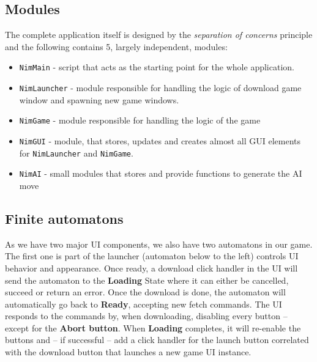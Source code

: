 \documentclass[10pt]{scrartcl}
\begin{document}
\subsection{Modules}
The complete application itself is designed by the \emph{separation of concerns} principle and the following contains 5, largely independent, modules:
\begin{itemize}
  \item \texttt{NimMain} - script that acts as the starting point for the whole application.
  \item \texttt{NimLauncher} - module responsible for handling the logic of download game window and spawning new game windows.
  \item \texttt{NimGame} - module responsible for handling the logic of the game
  \item \texttt{NimGUI} - module, that stores, updates and creates almost all GUI elements for \texttt{NimLauncher} and \texttt{NimGame}.
  \item \texttt{NimAI} - small modules that stores and provide functions to generate the AI move
\end{itemize}

\subsection{Finite automatons}
As we have two major UI components, we also have two automatons in our game. The first one is part of the launcher (automaton below to the left) controls UI behavior and appearance. Once ready, a download click handler in the UI will send the automaton to the \textbf{Loading} State where it can either be cancelled, succeed or return an error. Once the download is done, the automaton will automatically go back to \textbf{Ready}, accepting new fetch commands. The UI responds to the commands by, when downloading, disabling every button -- except for the \textbf{Abort button}. When \textbf{Loading} completes, it will re-enable the buttons and -- if successful -- add a click handler for the launch button correlated with the download button that launches a new game UI instance. 
\end{document}
